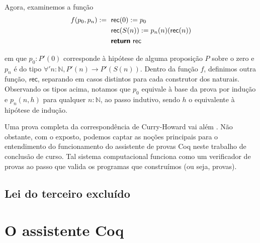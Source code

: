 Agora, examinemos a função \begin{equation*}\begin{split}
f(p_0, p_n) :=\textsf{ }& \textsf{rec}(0) := p_0 \\
& \textsf{rec}(S (n)) := p_n (n) (\textsf{rec}(n)) \\
& \textsf{\textbf{return} }\textsf{rec}
\end{split}\end{equation*}

\noindent
em que $p_0 : P'(0)$ corresponde à hipótese de alguma proposição $P$ sobre o zero e $p_n$ é do tipo $\forall' n:\mathbb{N}, P'(n) \to P'(S(n))$. Dentro da função $f$, definimos outra função, $\textsf{rec}$, separando em casos distintos para cada construtor dos naturais. Observando os tipos acima, notamos que $p_0$ equivale à base da prova por indução e $p_n(n, h)$ para qualquer $n:\mathbb{N}$, ao passo indutivo, sendo $h$ o equivalente à hipótese de indução.

Uma prova completa da correspondência de Curry-Howard vai além \cite{rafael_tcc}. Não obstante, com o exposto, podemos captar as noções principais para o entendimento do funcionamento do assistente de provas Coq neste trabalho de conclusão de curso. Tal sistema computacional funciona como um verificador de provas ao passo que valida os programas que construímos (ou seja, provas).

\subsection{Lei do terceiro excluído}

\section{O assistente Coq}